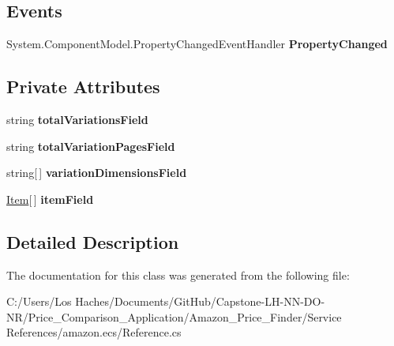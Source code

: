 \subsection*{Events}
\begin{DoxyCompactItemize}
\item 
\hypertarget{class_price___comparison_1_1amazon_1_1ecs_1_1_variations_a37bb6dd2b9db8acda054d7afd40dcfb2}{System.\-Component\-Model.\-Property\-Changed\-Event\-Handler {\bfseries Property\-Changed}}\label{class_price___comparison_1_1amazon_1_1ecs_1_1_variations_a37bb6dd2b9db8acda054d7afd40dcfb2}

\end{DoxyCompactItemize}
\subsection*{Private Attributes}
\begin{DoxyCompactItemize}
\item 
\hypertarget{class_price___comparison_1_1amazon_1_1ecs_1_1_variations_ad3eac90450ce85de433da3174881c27e}{string {\bfseries total\-Variations\-Field}}\label{class_price___comparison_1_1amazon_1_1ecs_1_1_variations_ad3eac90450ce85de433da3174881c27e}

\item 
\hypertarget{class_price___comparison_1_1amazon_1_1ecs_1_1_variations_ad6d0b92e1e3204c241e26423dc29f9a9}{string {\bfseries total\-Variation\-Pages\-Field}}\label{class_price___comparison_1_1amazon_1_1ecs_1_1_variations_ad6d0b92e1e3204c241e26423dc29f9a9}

\item 
\hypertarget{class_price___comparison_1_1amazon_1_1ecs_1_1_variations_a83d6201749981722c180c25bff0018a6}{string\mbox{[}$\,$\mbox{]} {\bfseries variation\-Dimensions\-Field}}\label{class_price___comparison_1_1amazon_1_1ecs_1_1_variations_a83d6201749981722c180c25bff0018a6}

\item 
\hypertarget{class_price___comparison_1_1amazon_1_1ecs_1_1_variations_adcc8e6c57956f34291977702af70c141}{\hyperlink{class_price___comparison_1_1amazon_1_1ecs_1_1_item}{Item}\mbox{[}$\,$\mbox{]} {\bfseries item\-Field}}\label{class_price___comparison_1_1amazon_1_1ecs_1_1_variations_adcc8e6c57956f34291977702af70c141}

\end{DoxyCompactItemize}


\subsection{Detailed Description}


The documentation for this class was generated from the following file\-:\begin{DoxyCompactItemize}
\item 
C\-:/\-Users/\-Los Haches/\-Documents/\-Git\-Hub/\-Capstone-\/\-L\-H-\/\-N\-N-\/\-D\-O-\/\-N\-R/\-Price\-\_\-\-Comparison\-\_\-\-Application/\-Amazon\-\_\-\-Price\-\_\-\-Finder/\-Service References/amazon.\-ecs/Reference.\-cs\end{DoxyCompactItemize}
